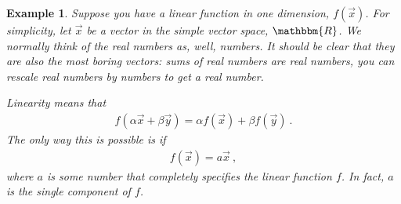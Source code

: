 \documentclass[
  11pt,
	colorful,
	raggedright,
]{tufte-style-thesis-flip}
\newtheorem{example}{Example}[section]
\begin{document}
\begin{example}
Suppose you have a linear function in one dimension, $f(\vec{x})$. For simplicity, let $\vec{x}$ be a vector in the simple vector space, $\mathbbm{R}$. We normally think of the real numbers as, well, numbers. It should be clear that they are also the most boring vectors: sums of real numbers are real numbers, you can rescale real numbers by numbers to get a real number. 


Linearity means that 
\begin{align}
  f(\alpha \vec{x}+\beta\vec{y}) =
  \alpha f(\vec{x})+ \beta f(\vec{y}) \ .
\end{align}
The only way this is possible is if
\begin{align}
  f(\vec{x}) = a\vec{x} \ ,
\end{align}
where $a$ is some number that completely specifies the linear function $f$. In fact, $a$ is the single \emph{component} of $f$. 
\end{example}
\end{document}
